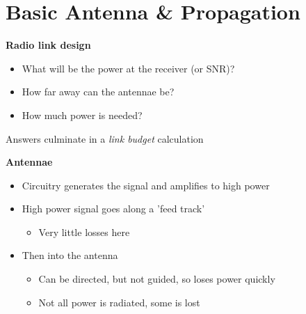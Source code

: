 \documentclass[12pt]{article}
\begin{document}
\section{Basic Antenna \& Propagation}
\textbf{Radio link design}
\begin{itemize}[noitemsep]
    \item What will be the power at the receiver (or SNR)?
    \item How far away can the antennae be?
    \item How much power is needed?
\end{itemize}
Answers culminate in a \textit{link budget} calculation

\textbf{Antennae}
\begin{itemize}[noitemsep]
    \item Circuitry generates the signal and amplifies to high power
    \item High power signal goes along a 'feed track'
    \begin{itemize}[noitemsep]
        \item Very little losses here
    \end{itemize}
    \item Then into the antenna
    \begin{itemize}[noitemsep]
        \item Can be directed, but not guided, so loses power quickly
        \item Not all power is radiated, some is lost
    \end{itemize}
\end{itemize}
\end{document}

